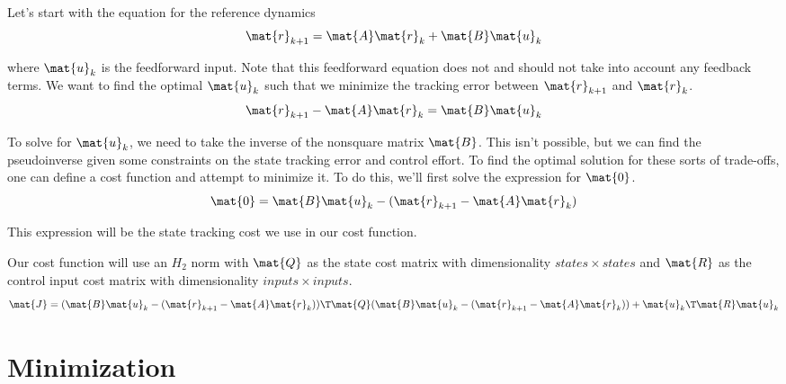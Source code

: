 Let's start with the equation for the \gls{reference} dynamics
\begin{equation*}
  \mat{r}_{k+1} = \mat{A}\mat{r}_k + \mat{B}\mat{u}_k
\end{equation*}

where $\mat{u}_k$ is the feedforward input. Note that this feedforward equation
does not and should not take into account any feedback terms. We want to find
the optimal $\mat{u}_k$ such that we minimize the \gls{tracking} error between
$\mat{r}_{k+1}$ and $\mat{r}_k$.
\begin{equation*}
  \mat{r}_{k+1} - \mat{A}\mat{r}_k = \mat{B}\mat{u}_k
\end{equation*}

To solve for $\mat{u}_k$, we need to take the inverse of the nonsquare matrix
$\mat{B}$. This isn't possible, but we can find the pseudoinverse given some
constraints on the \gls{state} \gls{tracking} error and \gls{control effort}. To
find the optimal solution for these sorts of trade-offs, one can define a cost
function and attempt to minimize it. To do this, we'll first solve the
expression for $\mat{0}$.
\begin{equation*}
  \mat{0} = \mat{B}\mat{u}_k - (\mat{r}_{k+1} - \mat{A}\mat{r}_k)
\end{equation*}

This expression will be the \gls{state} \gls{tracking} cost we use in our cost
function.

Our cost function will use an $H_2$ norm with $\mat{Q}$ as the \gls{state} cost
matrix with dimensionality $states \times states$ and $\mat{R}$ as the
\gls{control input} cost matrix with dimensionality $inputs \times inputs$.
\begin{equation*}
  \mat{J} = (\mat{B}\mat{u}_k - (\mat{r}_{k+1} - \mat{A}\mat{r}_k))\T \mat{Q}
    (\mat{B}\mat{u}_k - (\mat{r}_{k+1} - \mat{A}\mat{r}_k)) +
    \mat{u}_k\T\mat{R}\mat{u}_k
\end{equation*}

\section{Minimization}

